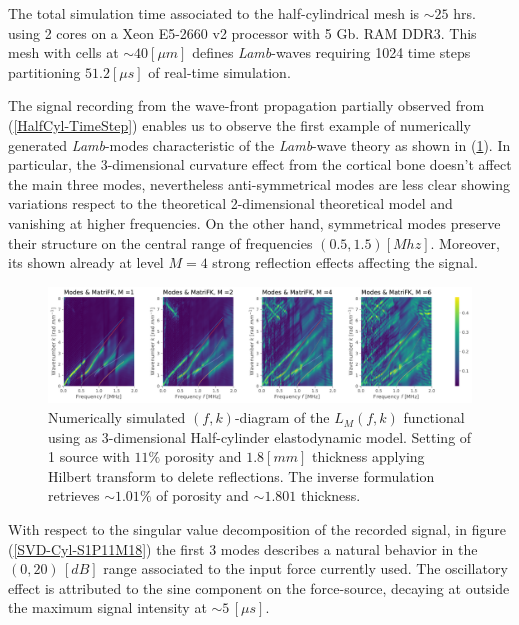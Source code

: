 \begin{rem}
The total simulation time associated to the half-cylindrical mesh is $\sim 25$ hrs. using 2 cores on a Xeon E5-2660 v2 processor with 5 Gb. RAM DDR3. This mesh with cells at $\sim 40 [\mu m]$ defines \textit{Lamb}-waves requiring 1024 time steps partitioning $51.2 [\mu s]$ of real-time simulation. 
\end{rem}

The signal recording from the wave-front propagation partially observed from (\ref{HalfCyl-TimeStep}) enables us to observe the first example of numerically generated \textit{Lamb}-modes characteristic of the \textit{Lamb}-wave theory as shown in (\ref{FK-Cyl-DiagramS1P11M18}). In particular, the 3-dimensional curvature effect from the cortical bone doesn't affect the main three modes, nevertheless anti-symmetrical modes are less clear showing variations respect to the theoretical 2-dimensional theoretical model and vanishing at higher frequencies. On the other hand, symmetrical modes preserve their structure on the central range of frequencies $(0.5, 1.5) [Mhz]$. Moreover, its shown already at level $M=4$ strong reflection effects affecting the signal.
\begin{figure}[!h]
	\centering
	\includegraphics[width=\textwidth]{images/ClusterSim/3DCylTimeP11TransIsoFKW18.pdf}
	\caption{Numerically simulated $(f,k)$-diagram of the $L_M(f,k)$ functional using as 3-dimensional Half-cylinder elastodynamic model. Setting of 1 source with $11\%$ porosity and $1.8 [mm]$ thickness applying Hilbert transform to delete reflections. The inverse formulation retrieves $\sim 1.01\%$ of porosity and $\sim 1.801$ thickness.}
	\label{FK-Cyl-DiagramS1P11M18}
\end{figure} 
With respect to the singular value decomposition of the recorded signal, in figure (\ref{SVD-Cyl-S1P11M18}) the first 3 modes describes a natural behavior in the $(0, 20) \, [dB]$ range associated to the input force currently used. The oscillatory effect is attributed to the sine component on the force-source, decaying at outside the maximum signal intensity at $\sim 5 \, [\mu s]$.
